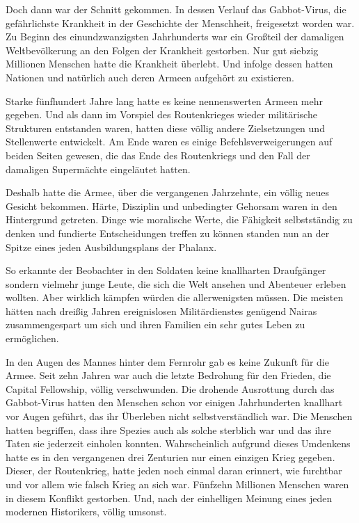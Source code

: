 \par

Doch dann war der Schnitt gekommen. In dessen Verlauf das Gabbot-Virus, die gefährlichste Krankheit in der Geschichte der Menschheit, freigesetzt worden war. Zu Beginn des einundzwanzigsten Jahrhunderts war ein Großteil der damaligen Weltbevölkerung an den Folgen der Krankheit gestorben. Nur gut siebzig Millionen Menschen hatte die Krankheit überlebt. Und infolge dessen hatten Nationen und natürlich auch deren Armeen aufgehört zu existieren.

\par

Starke fünfhundert Jahre lang hatte es keine nennenswerten Armeen mehr gegeben. Und als dann im Vorspiel des Routenkrieges wieder militärische Strukturen entstanden waren, hatten diese völlig andere Zielsetzungen und Stellenwerte entwickelt. Am Ende waren es einige Befehlsverweigerungen auf beiden Seiten gewesen, die das Ende des Routenkriegs und den Fall der damaligen Supermächte eingeläutet hatten.

\par

Deshalb hatte die Armee, über die vergangenen Jahrzehnte, ein völlig neues Gesicht bekommen. Härte, Disziplin und unbedingter Gehorsam waren in den Hintergrund getreten. Dinge wie moralische Werte, die Fähigkeit selbstständig zu denken und fundierte Entscheidungen treffen zu können standen nun an der Spitze eines jeden Ausbildungsplans der Phalanx.

\par

So erkannte der Beobachter in den Soldaten keine knallharten Draufgänger sondern vielmehr junge Leute, die sich die Welt ansehen und Abenteuer erleben wollten. Aber wirklich kämpfen würden die allerwenigsten müssen. Die meisten hätten nach dreißig Jahren ereignislosen Militärdienstes genügend Nairas zusammengespart um sich und ihren Familien ein sehr gutes Leben zu ermöglichen.

\par

In den Augen des Mannes hinter dem Fernrohr gab es keine Zukunft für die Armee. Seit zehn Jahren war auch die letzte Bedrohung für den Frieden, die Capital Fellowship, völlig verschwunden. Die drohende Ausrottung durch das Gabbot-Virus hatten den Menschen schon vor einigen Jahrhunderten knallhart vor Augen geführt, das ihr Überleben nicht selbstverständlich war. Die Menschen hatten begriffen, dass ihre Spezies auch als solche sterblich war und das ihre Taten sie jederzeit einholen konnten. Wahrscheinlich aufgrund dieses Umdenkens hatte es in den vergangenen drei Zenturien nur einen einzigen Krieg gegeben. Dieser, der Routenkrieg, hatte jeden noch einmal daran erinnert, wie furchtbar und vor allem wie falsch Krieg an sich war. Fünfzehn Millionen Menschen waren in diesem Konflikt gestorben. Und, nach der einhelligen Meinung eines jeden modernen Historikers, völlig umsonst.


